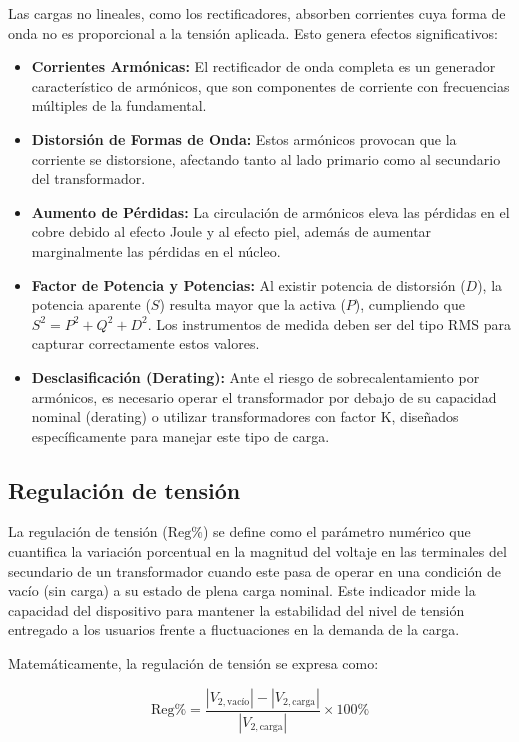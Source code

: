 Las cargas no lineales, como los rectificadores, absorben corrientes cuya forma de onda no es proporcional a la tensión aplicada. Esto genera efectos significativos:
\begin{itemize}
    \item \textbf{Corrientes Armónicas:} El rectificador de onda completa es un generador característico de armónicos, que son componentes de corriente con frecuencias múltiples de la fundamental.
    \item \textbf{Distorsión de Formas de Onda:} Estos armónicos provocan que la corriente se distorsione, afectando tanto al lado primario como al secundario del transformador.
    \item \textbf{Aumento de Pérdidas:} La circulación de armónicos eleva las pérdidas en el cobre debido al efecto Joule y al efecto piel, además de aumentar marginalmente las pérdidas en el núcleo.
    \item \textbf{Factor de Potencia y Potencias:} Al existir potencia de distorsión ($D$), la potencia aparente ($S$) resulta mayor que la activa ($P$), cumpliendo que $S^2 = P^2 + Q^2 + D^2$. Los instrumentos de medida deben ser del tipo RMS para capturar correctamente estos valores.
    \item \textbf{Desclasificación (Derating):} Ante el riesgo de sobrecalentamiento por armónicos, es necesario operar el transformador por debajo de su capacidad nominal (derating) o utilizar transformadores con factor K, diseñados específicamente para manejar este tipo de carga.
\end{itemize}

\subsection{Regulación de tensión}
La regulación de tensión ($\text{Reg\%}$) se define como el parámetro numérico que cuantifica la variación porcentual en la magnitud del voltaje en las terminales del secundario de un transformador cuando este pasa de operar en una condición de vacío (sin carga) a su estado de plena carga nominal. Este indicador mide la capacidad del dispositivo para mantener la estabilidad del nivel de tensión entregado a los usuarios frente a fluctuaciones en la demanda de la carga.

Matemáticamente, la regulación de tensión se expresa como:

\begin{equation}
    \text{Reg\%} = \frac{|V_{2,\text{vacío}}| - |V_{2,\text{carga}}|}{|V_{2,\text{carga}}|} \times 100\%
\end{equation}


